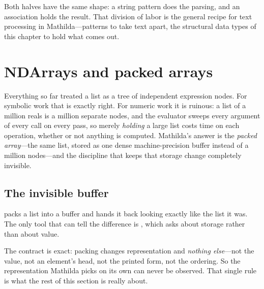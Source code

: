 Both halves have the same shape: a string pattern does the parsing, and an
association holds the result. That division of labor is the general recipe for text
processing in Mathilda---patterns to take text apart, the structural data types of
this chapter to hold what comes out.

\section{NDArrays and packed arrays}
\label{sec:ds-packed}

Everything so far treated a list as a tree of independent expression nodes. For
symbolic work that is exactly right. For numeric work it is ruinous: a list of a
million reals is a million separate nodes, and the evaluator sweeps every argument of
every call on every pass, so merely \emph{holding} a large list costs time on each
operation, whether or not anything is computed. Mathilda's answer is the
\emph{packed array}---the same list, stored as one dense
machine-precision buffer instead of a million nodes---and the discipline that keeps
that storage change completely invisible.

\subsection{The invisible buffer}
\label{ssec:ds-invisible}

 packs a list into a buffer and hands it back looking exactly like the
list it was. The only tool that can tell the difference is , which asks
about storage rather than about value.

\begin{codepairs}
\end{codepairs}

The contract is exact: packing changes representation and \emph{nothing else}---not
the value, not an element's head, not the printed form, not the ordering. So the
representation Mathilda picks on its own can never be observed. That single rule is
what the rest of this section is really about.

